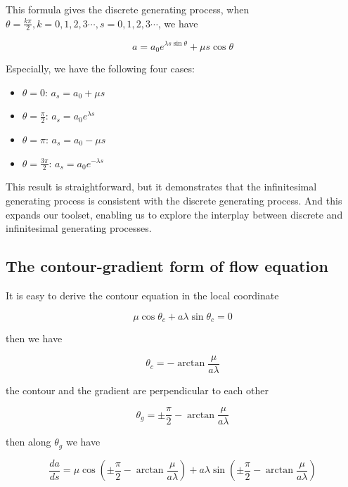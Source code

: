 This formula gives the discrete generating process, when $\theta = \frac{k \pi}{2}, k = 0, 1, 2, 3\cdots, s = 0, 1, 2, 3\cdots$, we have

\begin{equation}
    a = a_0 e^{\lambda s \sin \theta} + \mu s \cos \theta
\end{equation}

Especially, we have the following four cases:
\begin{itemize}
\item $\theta = 0$: $a_s = a_0 + \mu s$
\item $\theta = \frac{\pi}{2}$: $a_s = a_0 e^{\lambda s}$
\item $\theta = \pi$: $a_s = a_0 - \mu s$
\item $\theta = \frac{3 \pi}{2}$: $a_s = a_0 e^{- \lambda s} $
\end{itemize}

This result is straightforward, but it demonstrates that the infinitesimal generating process is consistent with the discrete generating process.
And this expands our toolset, enabling us to explore the interplay between discrete and infinitesimal generating processes.

\subsection{The contour-gradient form of flow equation}\label{subsec:the-contour-gradient-form}

It is easy to derive the contour equation in the local coordinate

\begin{equation}
    \mu \cos \theta_c + a \lambda \sin \theta_c = 0\label{eq:contour}
\end{equation}

then we have

\begin{equation}
    \theta_c = - \arctan \frac{\mu}{a \lambda}\label{eq:contourangle}
\end{equation}

the contour and the gradient are perpendicular to each other

\begin{equation}
    \theta_g = \pm \frac{\pi}{2} - \arctan \frac{\mu}{a \lambda}\label{eq:gradientangle}
\end{equation}

then along $\theta_g$ we have

\begin{equation}
    \frac{da}{ds} = \mu \cos (\pm \frac{\pi}{2} - \arctan \frac{\mu}{a \lambda}) + a \lambda \sin (\pm \frac{\pi}{2} - \arctan \frac{\mu}{a \lambda})
    \label{eq:alonggradient}
\end{equation}

